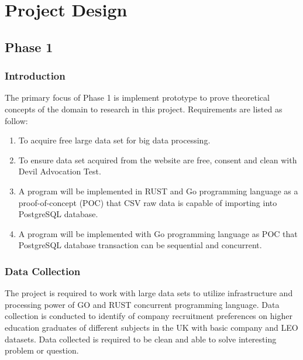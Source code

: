\chapter{Project Design} 

\label{Chapter3} 


\doublespacing



\section{Phase 1}


\subsection{Introduction}
The primary focus of Phase 1 is implement prototype to prove theoretical concepts of the domain to research in this project. Requirements are listed as follow:

\begin{enumerate}[topsep=0pt,itemsep=-1ex,partopsep=1ex,parsep=1.5ex]

\item To acquire free large data set for big data processing.
\item To ensure data set acquired from the website are free, consent and clean with Devil Advocation Test. 
\item A program will be implemented in RUST and Go programming language as a proof-of-concept (POC) that CSV raw data is capable of importing into PostgreSQL database.
\item A program will be implemented with Go programming language as POC that PostgreSQL database transaction can be sequential and concurrent.

\end{enumerate}

\pagebreak

\subsection{Data Collection}

The project is required to work with large data sets to utilize infrastructure and processing power of GO and RUST concurrent programming language. Data collection is conducted to identify of company recruitment preferences on higher education graduates of different subjects in the UK with basic company and LEO datasets. Data collected is required to be clean and able to solve interesting problem or question. 

